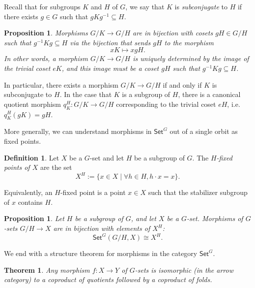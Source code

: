 \documentclass{amsart}
\newcommand{\Set}{\mathsf{Set}}
\newcommand{\GSet}{\Set^G}
\numberwithin{equation}{section}
\newtheorem{theorem}[equation]{Theorem}
\newtheorem{proposition}[equation]{Proposition}
\theoremstyle{definition}
\newtheorem{definition}[equation]{Definition}
\begin{document}
Recall that for subgroups $K$ and $H$ of $G$, we say that $K$ is \emph{subconjugate} to $H$ if there exists $g \in G$ such that $gKg^{-1} \subseteq H$.

\begin{proposition}
	\label{subconjugate and quotients}
	Morphisms $G/K \to G/H$ are in bijection with cosets $gH \in G/H$ such that $g^{-1}Kg \subseteq H$ via the bijection that sends $gH$ to the morphism
	\[
		xK \mapsto xgH.
	\]
	In other words, a morphism $G/K \to G/H$ is uniquely determined by the image of the trivial coset $eK$, and this image must be a coset $gH$ such that $g^{-1}Kg \subseteq H$.
\end{proposition}

In particular, there exists a morphism $G/K \to G/H$ if and only if $K$ is subconjugate to $H$. In the case that $K$ is a subgroup of $H$, there is a canonical quotient morphism $q^H_K \colon G/K \to G/H$ corresponding to the trivial coset $eH$, i.e. $q^H_K(gK) = gH$.

More generally, we can understand morphisms in $\GSet$ out of a single orbit as fixed points.

\begin{definition}
	Let $X$ be a $G$-set and let $H$ be a subgroup of $G$. The \emph{$H$-fixed points of $X$} are the set
	\[
		X^H := \{x \in X \mid \forall h \in H, h \cdot x = x\}.
	\]
\end{definition}

Equivalently, an $H$-fixed point is a point $x \in X$ such that the stabilizer subgroup of $x$ contains $H$.

\begin{proposition}
	\label{fixed points as morphisms from cosets}
	Let $H$ be a subgroup of $G$, and let $X$ be a $G$-set. Morphisms of $G$-sets $G/H \to X$ are in bijection with elements of $X^H$:
	\[
		\GSet(G/H,X) \cong X^H.
	\]
\end{proposition}

We end with a structure theorem for morphisms in the category $\GSet$.

\begin{theorem}
	\label{fold after quotient}
	Any morphism $f \colon X \to Y$ of $G$-sets is isomorphic (in the arrow category) to a coproduct of quotients followed by a coproduct of folds.
\end{theorem}
\end{document}

